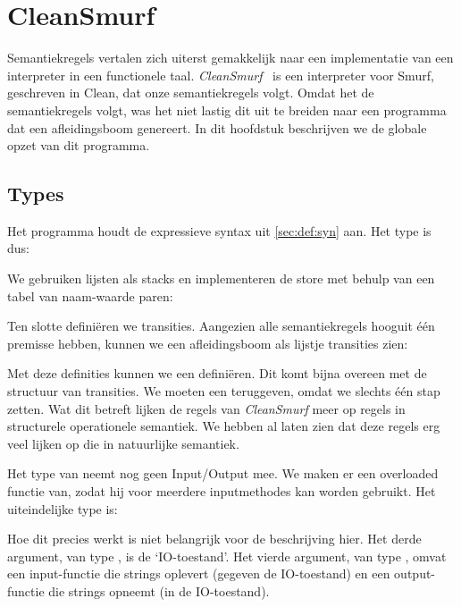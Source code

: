 \section{CleanSmurf}
\label{sec:cleansmurf}

Semantiekregels vertalen zich uiterst gemakkelijk naar een implementatie van
een interpreter in een functionele taal. \emph{CleanSmurf}~\cite{cleansmurf} is
een interpreter voor Smurf, geschreven in Clean, dat onze semantiekregels
volgt. Omdat het de semantiekregels volgt, was het niet lastig dit uit te
breiden naar een programma dat een afleidingsboom genereert. In dit hoofdstuk
beschrijven we de globale opzet van dit programma.

\subsection{Types}
\label{sec:cleansmurf:types}
Het programma houdt de expressieve syntax uit \autoref{sec:def:syn} aan. Het
type  is dus:



We gebruiken lijsten als stacks en implementeren de store met behulp van een
tabel van naam-waarde paren:



Ten slotte definiëren we transities. Aangezien alle semantiekregels hooguit één
premisse hebben, kunnen we een afleidingsboom als lijstje transities zien:



Met deze definities kunnen we een  definiëren. Dit komt bijna overeen met de structuur van transities. We
moeten een  teruggeven, omdat we slechts één stap zetten. Wat dit
betreft lijken de regels van \emph{CleanSmurf} meer op regels in structurele
operationele semantiek. We hebben al laten zien dat deze regels erg veel lijken
op die in natuurlijke semantiek.

Het type van  neemt nog geen Input/Output mee. We maken er een
overloaded functie van, zodat hij voor meerdere inputmethodes kan worden
gebruikt. Het uiteindelijke type is:



Hoe dit precies werkt is niet belangrijk voor de beschrijving hier. Het derde
argument, van type , is de `IO-toestand'. Het vierde argument, van type
, omvat een input-functie die strings oplevert (gegeven de
IO-toestand) en een output-functie die strings opneemt (in de IO-toestand).

